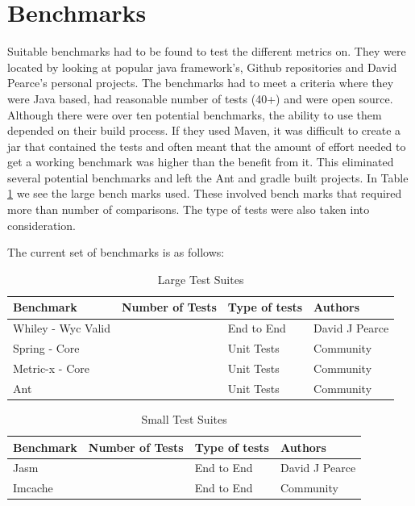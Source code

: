 \section{Benchmarks}
\label{S:bench}
Suitable benchmarks had to be found to test the different metrics on. They were located by looking at popular java framework's, Github repositories and David Pearce's personal projects. The benchmarks had to meet a criteria where they were Java based, had reasonable number of tests (40+) and were open source. Although there were over ten potential benchmarks, the ability to use them depended on their build process. If they used Maven, it was difficult to create a jar that contained the tests and often meant that the amount of effort needed to get a working benchmark was higher than the benefit from it. This eliminated several potential benchmarks and left the Ant and gradle built projects. In Table \ref{large_test} we see the large bench marks used. These involved bench marks that required more than  number of comparisons. The type of tests were also taken into consideration.

The current set of benchmarks is as follows:
\begin{table}[]
\centering
\caption{Large Test Suites}
\label{large_test}
\begin{tabular}{|l|l|l|l|}
\hline
{\bf Benchmark}       &  {\bf Number of Tests} & {\bf Type of tests} & {\bf Authors}   \\ \hline
Whiley - Wyc Valid         &       &    End to End      & David J Pearce          \\ \hline
Spring - Core   &       &    Unit Tests      & Community \\ \hline
Metric-x - Core &       &    Unit Tests      & Community \\ \hline
Ant             &       &    Unit Tests      & Community \\ \hline
\end{tabular}
\end{table}

\begin{table}[]
\centering
\caption{Small Test Suites}
\label{small_test}
\begin{tabular}{|l|l|l|l|}
\hline
{\bf Benchmark}   & {\bf Number of Tests} & {\bf Type of tests} & {\bf Authors}  \\ \hline
Jasm              &             &    End to End      & David J Pearce \\ \hline
Imcache &           &    End to End        & Community \\ \hline
\end{tabular}
\end{table}

